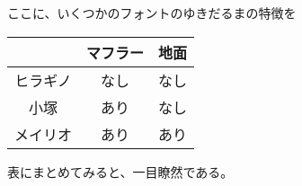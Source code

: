 

\showversion
ここに、いくつかのフォントのゆきだるまの特徴を
\begin{tabular}[c]{c|cc}
  \hline   & マフラー & 地面 \\ \hline
  ヒラギノ & なし     & なし \\
  小塚     & あり     & なし \\
  メイリオ & あり     & あり \\
  \hline\end{tabular}表にまとめてみると、一目瞭然である。

